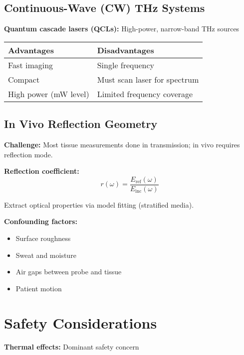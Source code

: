 \subsection{Continuous-Wave (CW) THz Systems}
\label{subsec:cw-thz}

\textbf{Quantum cascade lasers (QCLs):} High-power, narrow-band THz sources

\begin{center}
\begin{tabular}{@{}ll@{}}
\toprule
\textbf{Advantages} & \textbf{Disadvantages} \\
\midrule
Fast imaging & Single frequency \\
Compact & Must scan laser for spectrum \\
High power (mW level) & Limited frequency coverage \\
\bottomrule
\end{tabular}
\end{center}

\subsection{In Vivo Reflection Geometry}
\label{subsec:reflection-geometry}

\textbf{Challenge:} Most tissue measurements done in transmission; in vivo requires reflection mode.

\textbf{Reflection coefficient:}
\begin{equation}
\label{eq:reflection-coefficient}
r(\omega) = \frac{E_{\text{ref}}(\omega)}{E_{\text{inc}}(\omega)}
\end{equation}

Extract optical properties via model fitting (stratified media).

\textbf{Confounding factors:}
\begin{itemize}
\item Surface roughness
\item Sweat and moisture
\item Air gaps between probe and tissue
\item Patient motion
\end{itemize}

\section{Safety Considerations}
\label{sec:safety}

\textbf{Thermal effects:} Dominant safety concern

